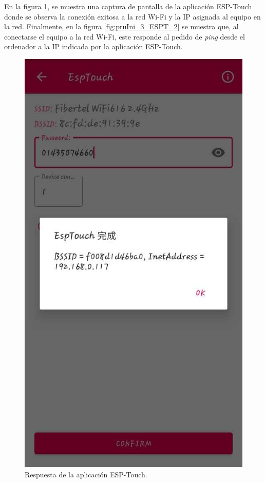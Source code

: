 En la figura \ref{fig:pruIni_3_ESPT_1}, se muestra una captura de pantalla de la aplicación ESP-Touch donde se observa la conexión exitosa a la red Wi-Fi y la IP asignada al equipo en la red. Finalmente, en la figura \ref{fig:pruIni_3_ESPT_2} se muestra que, al conectarse el equipo a la red Wi-Fi, este responde al pedido de \textit{ping} desde el ordenador a la IP indicada por la aplicación ESP-Touch.

\pagebreak

\begin{figure}[htpb]
	\centering
	\includegraphics[scale=0.4]{./Figures/ESP_Touch_ok.jpeg}
	\caption{Respuesta de la aplicación ESP-Touch.}
	\label{fig:pruIni_3_ESPT_1}
\end{figure}

